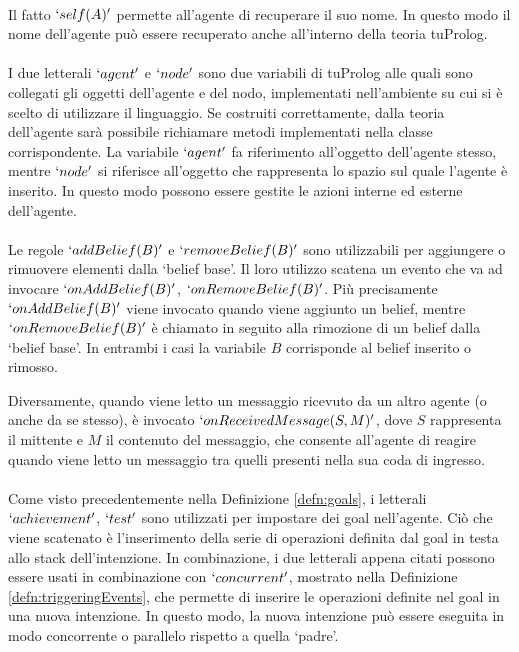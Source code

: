 \paragraph*{}
Il fatto $`self(A)'$ permette all'agente di recuperare il suo nome. In questo modo il nome dell'agente può essere recuperato anche all'interno della teoria tuProlog.

\paragraph*{}
I due letterali $`agent'$ e $`node'$ sono due variabili di tuProlog alle quali sono collegati gli oggetti dell'agente e del nodo, implementati nell'ambiente su cui si è scelto di utilizzare il linguaggio. Se costruiti correttamente, dalla teoria dell'agente sarà possibile richiamare metodi implementati nella classe corrispondente. La variabile $`agent'$ fa riferimento all'oggetto dell'agente stesso, mentre $`node'$ si riferisce all'oggetto che rappresenta lo spazio sul quale l'agente è inserito. In questo modo possono essere gestite le azioni interne ed esterne dell'agente.

\paragraph*{}
Le regole $`addBelief(B)'$ e $`removeBelief(B)'$ sono utilizzabili per aggiungere o rimuovere elementi dalla `belief base'. Il loro utilizzo scatena un evento che va ad invocare $`onAddBelief(B)'$, $`onRemoveBelief(B)'$. Più precisamente $`onAddBelief(B)'$ viene invocato quando viene aggiunto un belief, mentre $`onRemoveBelief(B)'$ è chiamato in seguito alla rimozione di un belief dalla `belief base'. In entrambi i casi la variabile $B$ corrisponde al belief inserito o rimosso.

Diversamente, quando viene letto un messaggio ricevuto da un altro agente (o anche da se stesso), è invocato $`onReceivedMessage(S, M)'$, dove $S$ rappresenta il mittente e $M$ il contenuto del messaggio, che consente all'agente di reagire quando viene letto un messaggio tra quelli presenti nella sua coda di ingresso.

\paragraph*{}
Come visto precedentemente nella Definizione \ref{defn:goals}, i letterali $`achievement'$, $`test'$ sono utilizzati per impostare dei goal nell'agente. Ciò che viene scatenato è l'inserimento della serie di operazioni definita dal goal in testa allo stack dell'intenzione.
In combinazione, i due letterali appena citati possono essere usati in combinazione con $`concurrent'$, mostrato nella Definizione \ref{defn:triggeringEvents}, che permette di inserire le operazioni definite nel goal in una nuova intenzione. In questo modo, la nuova intenzione può essere eseguita in modo concorrente o parallelo rispetto a quella `padre'.

